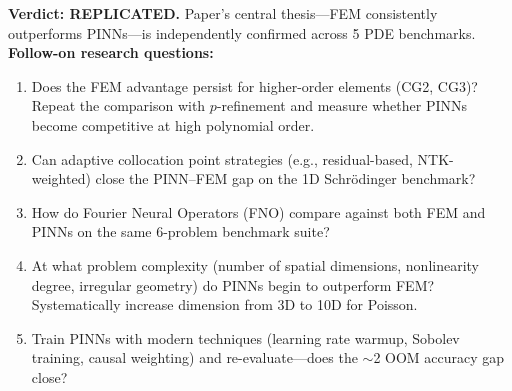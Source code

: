 \noindent\textbf{Verdict: REPLICATED.} Paper's central thesis---FEM consistently outperforms PINNs---is independently confirmed across 5 PDE benchmarks.
\noindent\textbf{Follow-on research questions:}
\begin{enumerate}[leftmargin=1.6em,itemsep=0.2em,topsep=0.2em,label=Q\arabic*.]
\item Does the FEM advantage persist for higher-order elements (CG2, CG3)? Repeat the comparison with $p$-refinement and measure whether PINNs become competitive at high polynomial order.
\item Can adaptive collocation point strategies (e.g., residual-based, NTK-weighted) close the PINN--FEM gap on the 1D Schr\"odinger benchmark?
\item How do Fourier Neural Operators (FNO) compare against both FEM and PINNs on the same 6-problem benchmark suite?
\item At what problem complexity (number of spatial dimensions, nonlinearity degree, irregular geometry) do PINNs begin to outperform FEM? Systematically increase dimension from 3D to 10D for Poisson.
\item Train PINNs with modern techniques (learning rate warmup, Sobolev training, causal weighting) and re-evaluate---does the $\sim$2 OOM accuracy gap close?
\end{enumerate}

